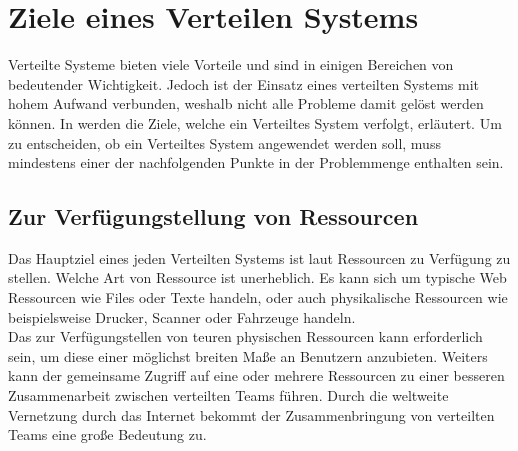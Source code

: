 \section{Ziele eines Verteilen Systems}\label{sec:distributedSystems:goales}
Verteilte Systeme bieten viele Vorteile und sind in einigen Bereichen von bedeutender Wichtigkeit. Jedoch ist der Einsatz eines verteilten Systems mit hohem Aufwand verbunden, weshalb nicht alle Probleme damit gelöst werden können. In \cite{tanenbaum2007distributed} werden die Ziele, welche ein Verteiltes System verfolgt, erläutert. Um zu entscheiden, ob ein Verteiltes System angewendet werden soll, muss mindestens einer der nachfolgenden Punkte in der Problemmenge enthalten sein.
\subsection{Zur Verfügungstellung von Ressourcen}\label{sec:distributedSystems:goales:resourceAccess} Das Hauptziel eines jeden Verteilten Systems ist laut \cite{tanenbaum2007distributed} Ressourcen zu Verfügung zu stellen. Welche Art von Ressource ist unerheblich. Es kann sich um typische Web Ressourcen wie Files oder Texte handeln, oder auch physikalische Ressourcen wie beispielsweise Drucker, Scanner oder Fahrzeuge handeln.\\
Das zur Verfügungstellen von teuren physischen Ressourcen kann erforderlich sein, um diese einer möglichst breiten Maße an Benutzern anzubieten. Weiters kann der gemeinsame Zugriff auf eine oder mehrere Ressourcen zu einer besseren Zusammenarbeit zwischen verteilten Teams führen. Durch die weltweite Vernetzung durch das Internet bekommt der Zusammenbringung von verteilten Teams eine große Bedeutung zu. 
